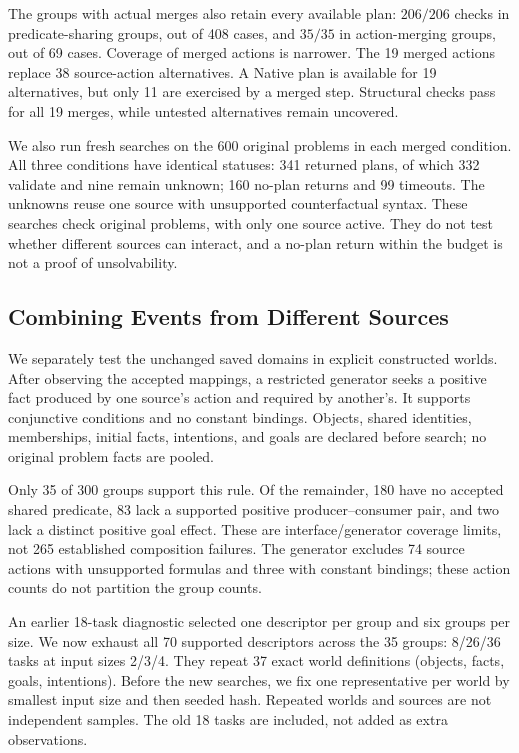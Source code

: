 The groups with actual merges also retain every available plan: $206/206$ checks in predicate-sharing groups, out of 408 cases, and $35/35$ in action-merging groups, out of 69 cases. Coverage of merged actions is narrower. The 19 merged actions replace 38 source-action alternatives. A Native plan is available for 19 alternatives, but only 11 are exercised by a merged step. Structural checks pass for all 19 merges, while untested alternatives remain uncovered.

We also run fresh searches on the 600 original problems in each merged condition. All three conditions have identical statuses: 341 returned plans, of which 332 validate and nine remain unknown; 160 no-plan returns and 99 timeouts. The unknowns reuse one source with unsupported counterfactual syntax. These searches check original problems, with only one source active. They do not test whether different sources can interact, and a no-plan return within the budget is not a proof of unsolvability.

\subsection{Combining Events from Different Sources}
We separately test the unchanged saved domains in explicit constructed worlds. After observing the accepted mappings, a restricted generator seeks a positive fact produced by one source's action and required by another's. It supports conjunctive conditions and no constant bindings. Objects, shared identities, memberships, initial facts, intentions, and goals are declared before search; no original problem facts are pooled.

Only 35 of 300 groups support this rule. Of the remainder, 180 have no accepted shared predicate, 83 lack a supported positive producer--consumer pair, and two lack a distinct positive goal effect. These are interface/generator coverage limits, not 265 established composition failures. The generator excludes 74 source actions with unsupported formulas and three with constant bindings; these action counts do not partition the group counts.

An earlier 18-task diagnostic selected one descriptor per group and six groups per size. We now exhaust all 70 supported descriptors across the 35 groups: 8/26/36 tasks at input sizes 2/3/4. They repeat 37 exact world definitions (objects, facts, goals, intentions). Before the new searches, we fix one representative per world by smallest input size and then seeded hash. Repeated worlds and sources are not independent samples. The old 18 tasks are included, not added as extra observations.

